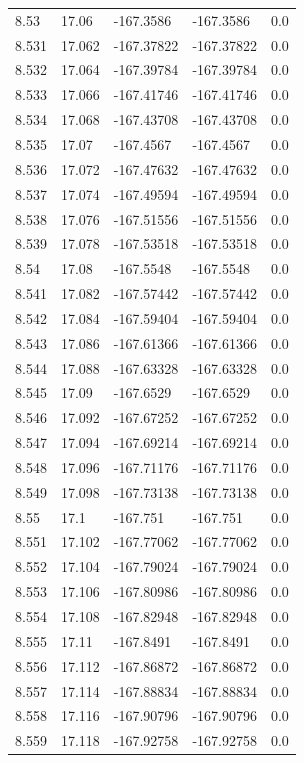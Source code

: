 \begin{tabular}{lllll}
8.53 & 17.06 & -167.3586 & -167.3586 & 0.0 \\
8.531 & 17.062 & -167.37822 & -167.37822 & 0.0 \\
8.532 & 17.064 & -167.39784 & -167.39784 & 0.0 \\
8.533 & 17.066 & -167.41746 & -167.41746 & 0.0 \\
8.534 & 17.068 & -167.43708 & -167.43708 & 0.0 \\
8.535 & 17.07 & -167.4567 & -167.4567 & 0.0 \\
8.536 & 17.072 & -167.47632 & -167.47632 & 0.0 \\
8.537 & 17.074 & -167.49594 & -167.49594 & 0.0 \\
8.538 & 17.076 & -167.51556 & -167.51556 & 0.0 \\
8.539 & 17.078 & -167.53518 & -167.53518 & 0.0 \\
8.54 & 17.08 & -167.5548 & -167.5548 & 0.0 \\
8.541 & 17.082 & -167.57442 & -167.57442 & 0.0 \\
8.542 & 17.084 & -167.59404 & -167.59404 & 0.0 \\
8.543 & 17.086 & -167.61366 & -167.61366 & 0.0 \\
8.544 & 17.088 & -167.63328 & -167.63328 & 0.0 \\
8.545 & 17.09 & -167.6529 & -167.6529 & 0.0 \\
8.546 & 17.092 & -167.67252 & -167.67252 & 0.0 \\
8.547 & 17.094 & -167.69214 & -167.69214 & 0.0 \\
8.548 & 17.096 & -167.71176 & -167.71176 & 0.0 \\
8.549 & 17.098 & -167.73138 & -167.73138 & 0.0 \\
8.55 & 17.1 & -167.751 & -167.751 & 0.0 \\
8.551 & 17.102 & -167.77062 & -167.77062 & 0.0 \\
8.552 & 17.104 & -167.79024 & -167.79024 & 0.0 \\
8.553 & 17.106 & -167.80986 & -167.80986 & 0.0 \\
8.554 & 17.108 & -167.82948 & -167.82948 & 0.0 \\
8.555 & 17.11 & -167.8491 & -167.8491 & 0.0 \\
8.556 & 17.112 & -167.86872 & -167.86872 & 0.0 \\
8.557 & 17.114 & -167.88834 & -167.88834 & 0.0 \\
8.558 & 17.116 & -167.90796 & -167.90796 & 0.0 \\
8.559 & 17.118 & -167.92758 & -167.92758 & 0.0 \\

\end{tabular}
